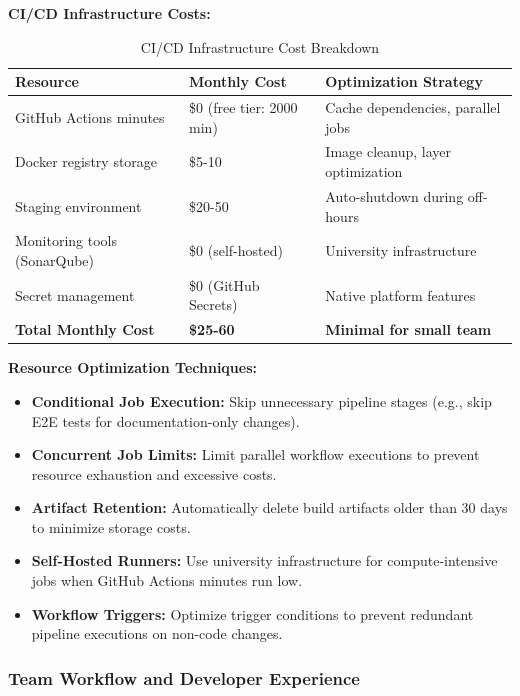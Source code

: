 \documentclass[12pt,a4paper]{article}
\begin{document}
\textbf{CI/CD Infrastructure Costs:}

\begin{table}[H]
\centering
\begin{tabular}{|p{5cm}|p{4cm}|p{4cm}|}
\hline
\textbf{Resource} & \textbf{Monthly Cost} & \textbf{Optimization Strategy} \\
\hline
GitHub Actions minutes & \$0 (free tier: 2000 min) & Cache dependencies, parallel jobs \\
\hline
Docker registry storage & \$5-10 & Image cleanup, layer optimization \\
\hline
Staging environment & \$20-50 & Auto-shutdown during off-hours \\
\hline
Monitoring tools (SonarQube) & \$0 (self-hosted) & University infrastructure \\
\hline
Secret management & \$0 (GitHub Secrets) & Native platform features \\
\hline
\textbf{Total Monthly Cost} & \textbf{\$25-60} & \textbf{Minimal for small team} \\
\hline
\end{tabular}
\caption{CI/CD Infrastructure Cost Breakdown}
\end{table}

\vspace{0.5em}

\textbf{Resource Optimization Techniques:}

\begin{itemize}[leftmargin=2em, itemsep=6pt]
    \item \textbf{Conditional Job Execution:} Skip unnecessary pipeline stages (e.g., skip E2E tests for documentation-only changes).
    \item \textbf{Concurrent Job Limits:} Limit parallel workflow executions to prevent resource exhaustion and excessive costs.
    \item \textbf{Artifact Retention:} Automatically delete build artifacts older than 30 days to minimize storage costs.
    \item \textbf{Self-Hosted Runners:} Use university infrastructure for compute-intensive jobs when GitHub Actions minutes run low.
    \item \textbf{Workflow Triggers:} Optimize trigger conditions to prevent redundant pipeline executions on non-code changes.
\end{itemize}

\subsubsection{Team Workflow and Developer Experience}
\end{document}
